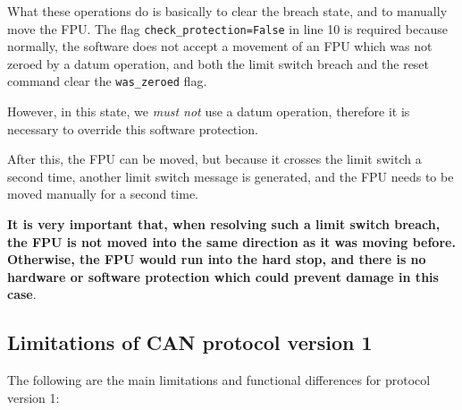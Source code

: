 \documentclass{scrartcl}[12pt,a4paper]
\begin{document}
What these operations do is basically to clear the breach state, and
to manually move the FPU.  The flag \texttt{check\_protection=False}
in line 10 is required because normally, the software does not accept
a movement of an FPU which was not zeroed by a datum operation,
and both the limit switch breach and the reset command clear the
\texttt{was\_zeroed} flag.

However, in this state, we \emph{must not} use a datum operation,
therefore it is necessary to override this software protection.

After this, the FPU can be moved, but because it crosses
the limit switch a second time, another limit switch
message is generated, and the FPU needs to be moved
manually for a second time.

\textbf{It is very important that, when resolving such a limit switch
  breach, the FPU is not moved into the same direction as it was
  moving before.  Otherwise, the FPU would run into the hard stop, and
  there is no hardware or software protection which could prevent
  damage in this case}.


\subsection{Limitations of CAN protocol version 1}

The following are the main limitations and functional
differences for protocol version 1:
\end{document}
